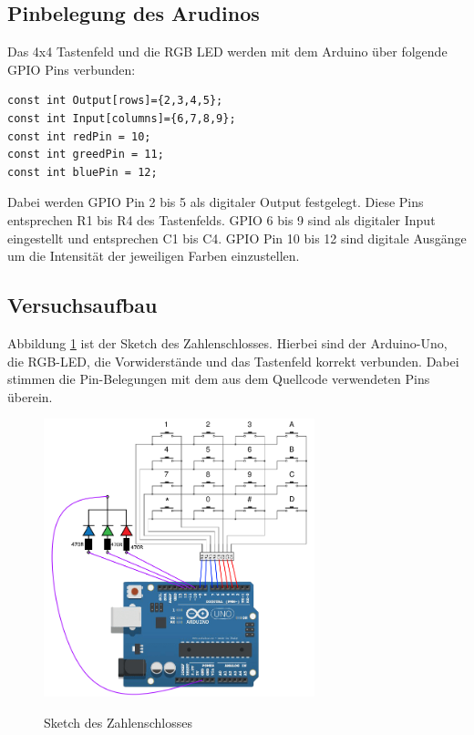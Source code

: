\subsection{Pinbelegung des Arudinos}

Das 4x4 Tastenfeld und die RGB LED werden mit dem Arduino über folgende GPIO Pins verbunden:
\begin{lstlisting}[style=CStyle]
const int Output[rows]={2,3,4,5};
const int Input[columns]={6,7,8,9};
const int redPin = 10;
const int greedPin = 11;
const int bluePin = 12;
\end{lstlisting}

Dabei werden GPIO Pin 2 bis 5 als digitaler Output festgelegt. Diese Pins entsprechen R1 bis R4 des Tastenfelds. GPIO 6 bis 9 sind als digitaler Input eingestellt und entsprechen C1 bis C4. GPIO Pin 10 bis 12 sind digitale Ausgänge um die Intensität der jeweiligen Farben einzustellen.

\subsection{Versuchsaufbau}

Abbildung \ref{fig:sketch} ist der Sketch des Zahlenschlosses. Hierbei sind der Arduino-Uno, die RGB-LED, die Vorwiderstände und das Tastenfeld korrekt verbunden. Dabei stimmen die Pin-Belegungen mit dem aus dem Quellcode verwendeten Pins überein. 

\begin{figure}[H]
    \caption{Sketch des Zahlenschlosses}
    \centering
    \includegraphics[width=0.7\textwidth]{images/sketch.png}
    \label{fig:sketch}
\end{figure}

